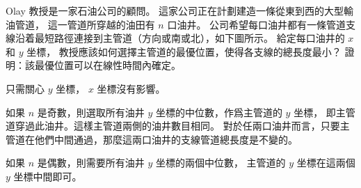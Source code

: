 Olay 教授是一家石油公司的顧問。
這家公司正在計劃建造一條從東到西的大型輸油管道，
這一管道所穿越的油田有 $n$ 口油井。
公司希望每口油井都有一條管道支線沿着最短路徑連接到主管道（方向或南或北），如下圖所示。
給定每口油井的 $x$ 和 $y$ 坐標，
教授應該如何選擇主管道的最優位置，使得各支線的總長度最小？
證明：該最優位置可以在線性時間內確定。

\externalfigure[e9_3_9-1]
\stopEXERCISE

\startANSWER
只需關心 $y$ 坐標， $x$ 坐標沒有影響。

如果 $n$ 是奇數，則選取所有油井 $y$ 坐標的中位數，作爲主管道的 $y$ 坐標，
即主管道穿過此油井。這樣主管道兩側的油井數目相同。
對於任兩口油井而言，只要主管道在他們中間通過，那麼這兩口油井的支線管道總長度是不變的。

如果 $n$ 是偶數，則需要所有油井 $y$ 坐標的兩個中位數，
主管道的 $y$ 坐標在這兩個 $y$ 坐標中間即可。
\stopANSWER

